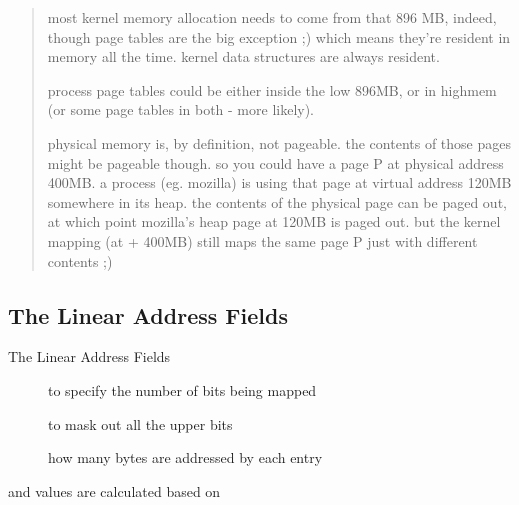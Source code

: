\begin{description}
\begin{quote}
  most kernel memory allocation needs to come from that 896 MB, indeed, though page tables
  are the big exception ;) which means they're resident in memory all the time. kernel
  data structures are always resident.

  process page tables could be either inside the low 896MB, or in highmem (or some page
  tables in both - more likely).

  physical memory is, by definition, not pageable. the contents of those pages might be
  pageable though. so you could have a page P at physical address 400MB. a process
  (eg. mozilla) is using that page at virtual address 120MB somewhere in its heap. the
  contents of the physical page can be paged out, at which point mozilla's heap page at
  120MB is paged out. but the kernel mapping (at  + 400MB) still maps
  the same page P just with different contents ;)
\end{quote}
\end{description}

\subsection{The Linear Address Fields}
\label{sec:paging-linux-1}
    
\begin{frame}{The Linear Address Fields}
    \begin{center}
    \end{center}
  \begin{description}
  \item[] to specify the number of bits being mapped
  \item[] to mask out all the upper bits
  \item[] how many bytes are addressed by each entry
  \end{description}
   and  values are calculated based on 
\end{frame}

